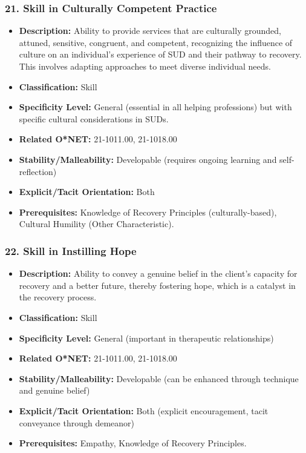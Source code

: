 \documentclass[
  letterpaper,
  DIV=11,
  numbers=noendperiod]{scrartcl}
\providecommand{\tightlist}{%
  \setlength{\itemsep}{0pt}\setlength{\parskip}{0pt}}
\begin{document}
\subsubsection{21. Skill in Culturally Competent
Practice}\label{skill-in-culturally-competent-practice}

\begin{itemize}
\tightlist
\item
  \textbf{Description:} Ability to provide services that are culturally
  grounded, attuned, sensitive, congruent, and competent, recognizing
  the influence of culture on an individual's experience of SUD and
  their pathway to recovery. This involves adapting approaches to meet
  diverse individual needs.
\item
  \textbf{Classification:} Skill
\item
  \textbf{Specificity Level:} General (essential in all helping
  professions) but with specific cultural considerations in SUDs.
\item
  \textbf{Related O*NET:} 21-1011.00, 21-1018.00
\item
  \textbf{Stability/Malleability:} Developable (requires ongoing
  learning and self-reflection)
\item
  \textbf{Explicit/Tacit Orientation:} Both
\item
  \textbf{Prerequisites:} Knowledge of Recovery Principles
  (culturally-based), Cultural Humility (Other Characteristic).
\end{itemize}

\subsubsection{22. Skill in Instilling
Hope}\label{skill-in-instilling-hope}

\begin{itemize}
\tightlist
\item
  \textbf{Description:} Ability to convey a genuine belief in the
  client's capacity for recovery and a better future, thereby fostering
  hope, which is a catalyst in the recovery process.
\item
  \textbf{Classification:} Skill
\item
  \textbf{Specificity Level:} General (important in therapeutic
  relationships)
\item
  \textbf{Related O*NET:} 21-1011.00, 21-1018.00
\item
  \textbf{Stability/Malleability:} Developable (can be enhanced through
  technique and genuine belief)
\item
  \textbf{Explicit/Tacit Orientation:} Both (explicit encouragement,
  tacit conveyance through demeanor)
\item
  \textbf{Prerequisites:} Empathy, Knowledge of Recovery Principles.
\end{itemize}
\end{document}
